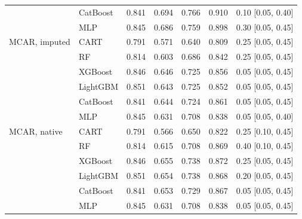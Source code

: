 \begin{table}[p]
\begin{tabular}{@{}llrrrrl@{}}
 & CatBoost & 0.841 & 0.694 & 0.766 & 0.910 & 0.10 [0.05, 0.40] \\
 & MLP & 0.845 & 0.686 & 0.759 & 0.898 & 0.30 [0.05, 0.45] \\
\midrule
MCAR, imputed & CART & 0.791 & 0.571 & 0.640 & 0.809 & 0.25 [0.05, 0.45] \\
 & RF & 0.814 & 0.603 & 0.686 & 0.842 & 0.25 [0.05, 0.45] \\
 & XGBoost & 0.846 & 0.646 & 0.725 & 0.856 & 0.05 [0.05, 0.45] \\
 & LightGBM & 0.851 & 0.643 & 0.725 & 0.852 & 0.05 [0.05, 0.45] \\
 & CatBoost & 0.841 & 0.644 & 0.724 & 0.861 & 0.05 [0.05, 0.45] \\
 & MLP & 0.845 & 0.631 & 0.708 & 0.838 & 0.05 [0.05, 0.40] \\
\midrule
MCAR, native & CART & 0.791 & 0.566 & 0.650 & 0.822 & 0.25 [0.10, 0.45] \\
 & RF & 0.814 & 0.615 & 0.708 & 0.869 & 0.40 [0.10, 0.45] \\
 & XGBoost & 0.846 & 0.655 & 0.738 & 0.872 & 0.25 [0.05, 0.45] \\
 & LightGBM & 0.851 & 0.654 & 0.738 & 0.868 & 0.20 [0.05, 0.45] \\
 & CatBoost & 0.841 & 0.653 & 0.729 & 0.867 & 0.05 [0.05, 0.45] \\
 & MLP & 0.845 & 0.631 & 0.708 & 0.838 & 0.05 [0.05, 0.45] \\
\bottomrule
\end{tabular}
\end{table}

